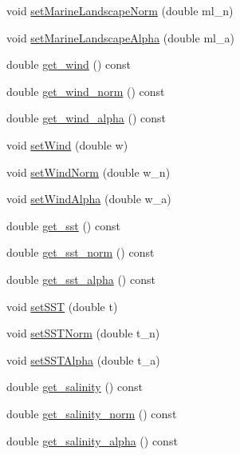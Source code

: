 \begin{DoxyCompactItemize}
\item 
void \mbox{\hyperlink{class_node_a32a0e9ea430bfcf3db1075f0a68d4b6f}{set\+Marine\+Landscape\+Norm}} (double ml\+\_\+n)
\item 
void \mbox{\hyperlink{class_node_a62f4b4e80cedace46e4515bbc0a4b1b0}{set\+Marine\+Landscape\+Alpha}} (double ml\+\_\+a)
\item 
double \mbox{\hyperlink{class_node_a2d4f700eb12bf497b8d2a00376e82601}{get\+\_\+wind}} () const
\item 
double \mbox{\hyperlink{class_node_a7abd913f06a339257fed33984c732af4}{get\+\_\+wind\+\_\+norm}} () const
\item 
double \mbox{\hyperlink{class_node_ade32342e43c7fead12915f188afe5c9a}{get\+\_\+wind\+\_\+alpha}} () const
\item 
void \mbox{\hyperlink{class_node_abac58416d7f51856d47a244475987b75}{set\+Wind}} (double w)
\item 
void \mbox{\hyperlink{class_node_a32c8969f056f3ae9159faba9eae50169}{set\+Wind\+Norm}} (double w\+\_\+n)
\item 
void \mbox{\hyperlink{class_node_a22be445836c092729574d3bd5a97661f}{set\+Wind\+Alpha}} (double w\+\_\+a)
\item 
double \mbox{\hyperlink{class_node_a415da489121104abacc90e9cb1a92805}{get\+\_\+sst}} () const
\item 
double \mbox{\hyperlink{class_node_a7df6409a6fefb332e651d8eac9e6ee0f}{get\+\_\+sst\+\_\+norm}} () const
\item 
double \mbox{\hyperlink{class_node_a599facf298e04d5c59239a5566e62787}{get\+\_\+sst\+\_\+alpha}} () const
\item 
void \mbox{\hyperlink{class_node_a6f1c6c34045788af947b11efd4a0b1fc}{set\+S\+ST}} (double t)
\item 
void \mbox{\hyperlink{class_node_ac754bdd207b4bee7c3b59d9f82b8f06a}{set\+S\+S\+T\+Norm}} (double t\+\_\+n)
\item 
void \mbox{\hyperlink{class_node_a1f2b09908b727d059ddf20e47a0ac72d}{set\+S\+S\+T\+Alpha}} (double t\+\_\+a)
\item 
double \mbox{\hyperlink{class_node_aef951d924fccfa00d85fb6266958b7d9}{get\+\_\+salinity}} () const
\item 
double \mbox{\hyperlink{class_node_aba57d21b5bc8a9347b14dafcf870d104}{get\+\_\+salinity\+\_\+norm}} () const
\item 
double \mbox{\hyperlink{class_node_acf70e42469453174491104645e5b93e3}{get\+\_\+salinity\+\_\+alpha}} () const
\item 

\end{DoxyCompactItemize}

